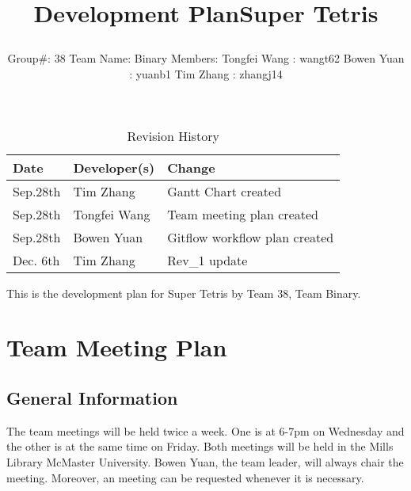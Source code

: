 \documentclass[12pt]{article}
\title{\parbox{\linewidth}{\centering Development Plan\endgraf\bigskip Super Tetris}}
\author{\parbox{\linewidth}{\bigskip \centering Group\#: 38 \endgraf\bigskip Team Name: Binary \endgraf\bigskip Members: \endgraf\bigskip Tongfei Wang : wangt62 \endgraf\bigskip Bowen Yuan : yuanb1 \endgraf\bigskip Tim Zhang : zhangj14}}
\date{\parbox{\linewidth}{\bigskip\bigskip \centering \today\endgraf\bigskip SFWR ENG 3XA3 \endgraf\bigskip McMaster University}}
\newcommand\tab[1][1cm]{\hspace*{#1}}
\begin{document}
\begin{table}[hp]
\caption{Revision History} \label{TblRevisionHistory}
\begin{tabularx}{\textwidth}{llX}
\toprule
\textbf{Date} & \textbf{Developer(s)} & \textbf{Change}\\
\midrule
Sep.28th & Tim Zhang & Gantt Chart created\\
Sep.28th & Tongfei Wang & Team meeting plan created\\
Sep.28th & Bowen Yuan & Gitflow workflow plan created\\
Dec. 6th & Tim Zhang & Rev\_1 update\\
\bottomrule
\end{tabularx}
\end{table}

\newpage

\maketitle

This is the development plan for Super Tetris by Team 38, Team Binary.
\newpage
\tableofcontents
\newpage

\section{Team Meeting Plan}
\subsection{General Information}
\tab The team meetings will be held twice a week. One is at 6-7pm on Wednesday and the other is at the same time on Friday. Both meetings will be held in the Mills Library McMaster University. Bowen Yuan, the team leader, will always chair the meeting. Moreover, an meeting can be requested whenever it is necessary. 
\end{document}
